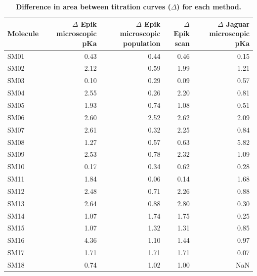 \documentclass[9pt,lineno]{elife}
\begin{document}
\begin{table}[H]
    \centering
    \caption{{\bf Difference in area between titration curves ($\Delta$) for each method.} }
    \label{tab:titration_curves}
    \begin{tabular}{lrrrr}
\toprule
Molecule &  $\Delta$ Epik microscopic pKa &  $\Delta$ Epik microscopic population  &  $\Delta$ Epik scan &  $\Delta$ Jaguar microscopic pKa \\

\midrule
    SM01 &       0.43 &        0.44 &         0.46 &         0.15 \\
    SM02 &       2.12 &        0.59 &         1.99 &         1.21 \\
    SM03 &       0.10 &        0.29 &         0.09 &         0.57 \\
    SM04 &       2.55 &        0.26 &         2.20 &         0.81 \\
    SM05 &       1.93 &        0.74 &         1.08 &         0.51 \\
    SM06 &       2.60 &        2.52 &         2.62 &         2.09 \\
    SM07 &       2.61 &        0.32 &         2.25 &         0.84 \\
    SM08 &       1.27 &        0.57 &         0.63 &         5.82 \\
    SM09 &       2.53 &        0.78 &         2.32 &         1.09 \\
    SM10 &       0.17 &        0.34 &         0.62 &         0.28 \\
    SM11 &       1.84 &        0.06 &         0.14 &         1.68 \\
    SM12 &       2.48 &        0.71 &         2.26 &         0.88 \\
    SM13 &       2.64 &        0.88 &         2.80 &         0.30 \\
    SM14 &       1.07 &        1.74 &         1.75 &         0.25 \\
    SM15 &       1.07 &        1.32 &         1.31 &         0.85 \\
    SM16 &       4.36 &        1.10 &         1.44 &         0.97 \\
    SM17 &       1.71 &        1.71 &         1.71 &         0.07 \\
    SM18 &       0.74 &        1.02 &         1.00 &          NaN \\

\end{tabular}
\end{table}
\end{document}
